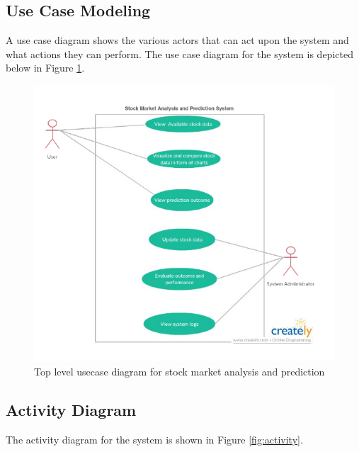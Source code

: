 \newpage
\subsection{Use Case Modeling}
A use case diagram shows the various actors that can act upon the system and what actions they can perform.
The use case diagram for the system is depicted below in Figure \ref{fig:usecase}.
\begin{figure}[h!]
  \includegraphics[width=6in]{fig/usecase}
  \caption{Top level usecase diagram for stock market analysis and prediction }\label{fig:usecase}
\end{figure}

\newpage
\subsection{Activity Diagram}
The activity diagram for the system is shown in Figure \ref{fig:activity}.

